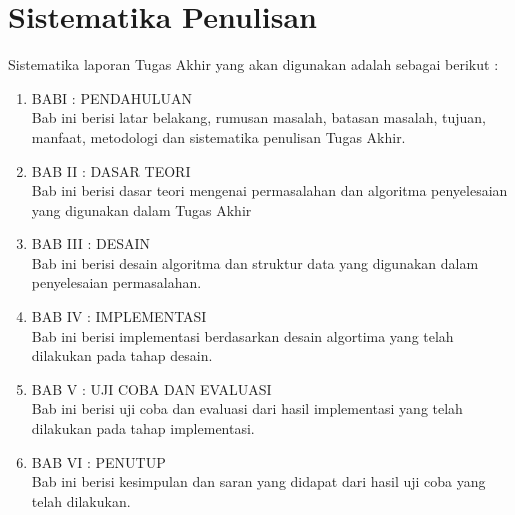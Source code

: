 \section {Sistematika Penulisan}
Sistematika laporan Tugas Akhir yang akan digunakan adalah sebagai berikut :
\begin{enumerate}
    \item BABI : PENDAHULUAN\\
    Bab ini berisi latar belakang, rumusan masalah, batasan masalah, tujuan, manfaat, metodologi dan sistematika penulisan Tugas Akhir.
    \item BAB II : DASAR TEORI\\
    Bab ini berisi dasar teori mengenai permasalahan dan algoritma penyelesaian yang digunakan dalam Tugas Akhir
    \item BAB III : DESAIN\\
    Bab ini berisi desain algoritma dan struktur data yang digunakan dalam penyelesaian permasalahan.
    \item BAB IV : IMPLEMENTASI\\
    Bab ini berisi implementasi berdasarkan desain algortima yang telah dilakukan pada tahap desain.
    \item BAB V : UJI COBA DAN EVALUASI\\
    Bab ini berisi uji coba dan evaluasi dari hasil implementasi yang telah dilakukan pada tahap implementasi.
    \item BAB VI : PENUTUP\\
    Bab ini berisi kesimpulan dan saran yang didapat dari hasil uji coba yang telah dilakukan.
\end{enumerate}